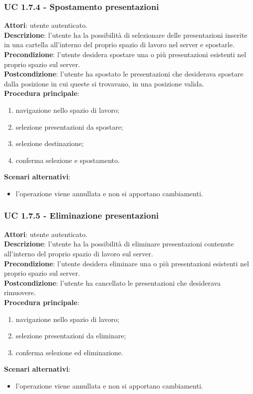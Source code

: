 	\subsubsection{UC 1.7.4 - Spostamento presentazioni}{
		\label{uc1.7.4}
		\textbf{Attori}: utente autenticato.	\\
		\textbf{Descrizione}: l'utente ha la possibilità di selezionare delle presentazioni inserite in una cartella all'interno del proprio spazio di lavoro nel server e spostarle. \\
		\textbf{Precondizione}: l'utente desidera spostare una o più presentazioni esistenti nel proprio spazio sul server.	\\
		\textbf{Postcondizione}: l'utente ha spostato le presentazioni che desiderava spostare dalla posizione in cui queste si trovavano, in una posizione valida.	\\
		\textbf{Procedura principale}:
		\begin{enumerate}
			\item navigazione nello spazio di lavoro;
			\item selezione presentazioni da spostare;
			\item selezione destinazione;
			\item conferma selezione e spostamento.
		\end{enumerate}
		\textbf{Scenari alternativi}: 
		\begin{itemize}
			\item l'operazione viene annullata e non si apportano cambiamenti.
		\end{itemize}
		}
	\subsubsection{UC 1.7.5 - Eliminazione presentazioni}{
		\label{uc1.7.5}
		\textbf{Attori}: utente autenticato.	\\
		\textbf{Descrizione}: l'utente ha la possibilità di eliminare presentazioni contenute all'interno del proprio spazio di lavoro sul server. \\
		\textbf{Precondizione}: l'utente desidera eliminare una o più presentazioni esistenti nel proprio spazio sul server.	\\
		\textbf{Postcondizione}: l'utente ha cancellato le presentazioni che desiderava rimuovere.	\\
		\textbf{Procedura principale}:
		\begin{enumerate}
			\item navigazione nello spazio di lavoro;
			\item selezione presentazioni da eliminare;
			\item conferma selezione ed eliminazione.
		\end{enumerate}
		\textbf{Scenari alternativi}: 
		\begin{itemize}
			\item l'operazione viene annullata e non si apportano cambiamenti.
		\end{itemize}
		}
